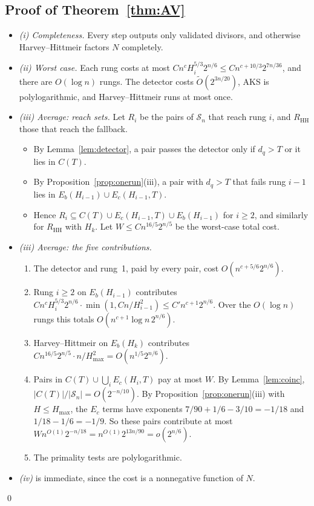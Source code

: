 \documentclass[11pt]{amsart}
\theoremstyle{definition}
\newcommand{\Sn}{\mathcal{S}_n}
\newcommand{\HH}{\mathrm{HH}}
\begin{document}
\subsection{Proof of Theorem~\ref{thm:AV}}
\begin{itemize}
\item \emph{(i) Completeness.} Every step outputs only validated divisors, and otherwise
  Harvey--Hittmeir factors $N$ completely.
\item \emph{(ii) Worst case.} Each rung costs at most $Cn^cH_i^{5/3}2^{n/6}\le
  Cn^{c+10/3}2^{7n/36}$, and there are $O(\log n)$ rungs. The detector costs
  $\tilde O(2^{3n/20})$, AKS is polylogarithmic, and Harvey--Hittmeir runs at most once.
\item \emph{(iii) Average: reach sets.} Let $R_i$ be the pairs of $\Sn$ that reach rung $i$, and
  $R_{\HH}$ those that reach the fallback.
  \begin{itemize}
  \item By Lemma~\ref{lem:detector}, a pair passes the detector only if $d_q>T$ or it lies in
    $C(T)$.
  \item By Proposition~\ref{prop:onerun}(iii), a pair with $d_q>T$ that fails rung $i-1$ lies in
    $E_b(H_{i-1})\cup E_c(H_{i-1},T)$.
  \item Hence $R_i\subseteq C(T)\cup E_c(H_{i-1},T)\cup E_b(H_{i-1})$ for $i\ge2$, and similarly
    for $R_{\HH}$ with $H_k$. Let $W\le Cn^{16/5}2^{n/5}$ be the worst-case total cost.
  \end{itemize}
\item \emph{(iii) Average: the five contributions.}
  \begin{enumerate}[label=(\alph*)]
  \item The detector and rung~1, paid by every pair, cost $O(n^{c+5/6}2^{n/6})$.
  \item Rung $i\ge2$ on $E_b(H_{i-1})$ contributes
    $Cn^cH_i^{5/3}2^{n/6}\cdot\min(1,Cn/H_{i-1}^2)\le C'n^{c+1}2^{n/6}$. Over the $O(\log n)$
    rungs this totals $O(n^{c+1}\log n\,2^{n/6})$.
  \item Harvey--Hittmeir on $E_b(H_k)$ contributes $Cn^{16/5}2^{n/5}\cdot n/H_{\max}^2=O(n^{1/5}2^{n/6})$.
  \item Pairs in $C(T)\cup\bigcup_iE_c(H_i,T)$ pay at most $W$. By Lemma~\ref{lem:coinc},
    $|C(T)|/|\Sn|=O(2^{-n/10})$. By Proposition~\ref{prop:onerun}(iii) with $H\le H_{\max}$,
    the $E_c$ terms have exponents $7/90+1/6-3/10=-1/18$ and $1/18-1/6=-1/9$. So these pairs
    contribute at most $Wn^{O(1)}2^{-n/18}=n^{O(1)}2^{13n/90}=o(2^{n/6})$.
  \item The primality tests are polylogarithmic.
  \end{enumerate}
\item \emph{(iv)} is immediate, since the cost is a nonnegative function of $N$.
\end{itemize}
\qed
\end{document}
